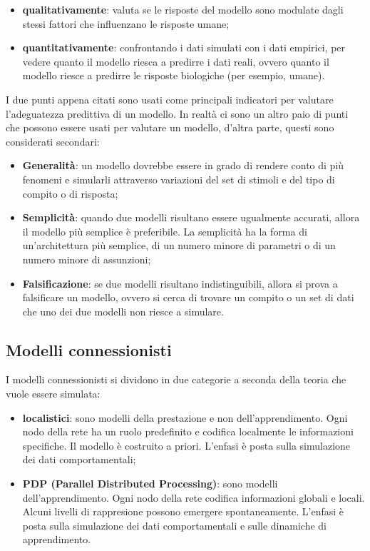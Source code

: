 \begin{itemize}
	\item \textbf{qualitativamente}: valuta se le risposte del modello sono 
		modulate dagli stessi fattori che influenzano le risposte umane;

	\item \textbf{quantitativamente}: confrontando i dati simulati con i dati
		empirici, per vedere quanto il modello riesca a predirre i dati reali,
		ovvero quanto il modello riesce a predirre le risposte biologiche (per
		esempio, umane).
\end{itemize}

I due punti appena citati sono usati come principali indicatori per valutare
l'adeguatezza predittiva di un modello. In realtà ci sono un altro paio di punti
che possono essere usati per valutare un modello, d'altra parte, questi sono
considerati secondari:

\begin{itemize}
	\item \textbf{Generalità}: un modello dovrebbe essere in grado di rendere
		conto di più fenomeni e simularli attraverso variazioni del set di
		stimoli e del tipo di compito o di risposta;

	\item \textbf{Semplicità}: quando due modelli risultano essere ugualmente
		accurati, allora il modello più semplice è preferibile. La semplicità ha
		la forma di un'architettura più semplice, di un numero minore di
		parametri o di un numero minore di assunzioni;

	\item \textbf{Falsificazione}: se due modelli risultano indistinguibili,
		allora si prova a falsificare un modello, ovvero si cerca di trovare un
		compito o un set di dati che uno dei due modelli non riesce a 
		simulare. 
\end{itemize}

\subsection{Modelli connessionisti}

I modelli connessionisti si dividono in due categorie a seconda della teoria che
vuole essere simulata:
\begin{itemize}
	\item \textbf{localistici}: sono modelli della prestazione e non
	dell'apprendimento. Ogni nodo della rete ha un ruolo predefinito e codifica
	localmente le informazioni specifiche. Il modello è costruito a priori.
	L'enfasi è posta sulla simulazione dei dati comportamentali;

	\item \textbf{PDP (Parallel Distributed Processing)}: sono modelli 
		dell'apprendimento. Ogni nodo della rete codifica
		informazioni globali e locali. Alcuni livelli di rappresione possono
		emergere spontaneamente. L'enfasi è posta sulla simulazione dei dati
		comportamentali e sulle dinamiche di apprendimento.
\end{itemize}
